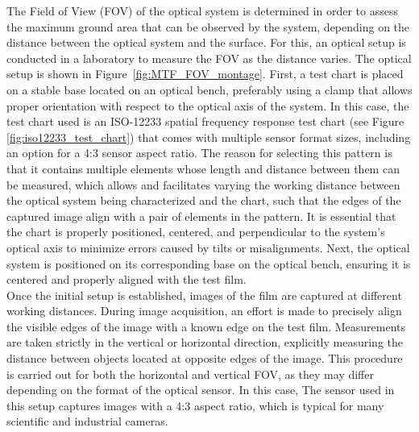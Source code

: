 \noindent The Field of View (FOV) of the optical system is determined in order to assess the maximum ground area that can be observed by the system, depending on the distance between the optical system and the surface. For this, an optical setup is conducted in a laboratory to measure the FOV as the distance varies. The optical setup is shown in Figure~\ref{fig:MTF_FOV_montage}. First, a test chart is placed on a stable base located on an optical bench, preferably using a clamp that allows proper orientation with respect to the optical axis of the system. In this case, the test chart used is an ISO-12233 spatial frequency response test chart (see Figure \ref{fig:iso12233_test_chart}) that comes with multiple sensor format sizes, including an option for a 4:3 sensor aspect ratio. The reason for selecting this pattern is that it contains multiple elements whose length and distance between them can be measured, which allows and facilitates varying the working distance between the optical system being characterized and the chart, such that the edges of the captured image align with a pair of elements in the pattern. It is essential that the chart is properly positioned, centered, and perpendicular to the system's optical axis to minimize errors caused by tilts or misalignments. Next, the optical system is positioned on its corresponding base on the optical bench, ensuring it is centered and properly aligned with the test film.\\ 

\noindent Once the initial setup is established, images of the film are captured at different working distances. During image acquisition, an effort is made to precisely align the visible edges of the image with a known edge on the test film. Measurements are taken strictly in the vertical or horizontal direction, explicitly measuring the distance between objects located at opposite edges of the image. This procedure is carried out for both the horizontal and vertical FOV, as they may differ depending on the format of the optical sensor. In this case, The sensor used in this setup captures images with a 4:3 aspect ratio, which is typical for many scientific and industrial cameras. 


